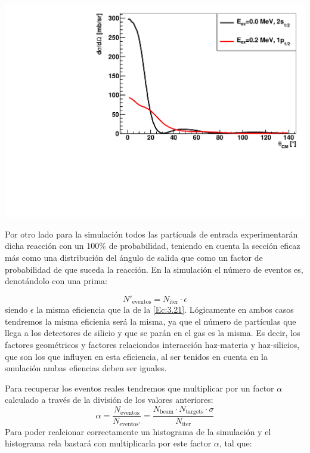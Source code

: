 \begin{center}
	\includegraphics[width=0.7\linewidth]{Imagenes/Seccion_Eficaz.pdf}
	\label{Fig:04-seccion_eficaz}
\end{center}

Por otro lado para la simulación todos las partícuals de entrada experimentarán dicha reacción con un 100\% de probabilidad, teniendo en cuenta la sección eficaz más como una distribución del ángulo de salida que como un factor de probabilidad de  que suceda la reacción. En la simulación el número de eventos es, denotándolo con una prima:

\begin{equation}
	N'_{\text{eventos}} = N_{\text{iter}} \cdot \epsilon
\end{equation}
siendo $\epsilon$ la misma eficiencia que la de la \cref{Ec:3.21}. Lógicamente en ambos casos tendremos la misma eficienia será la misma, ya que el número de partículas que llega a los detectores de silicio y que se parán en el gas es la misma. Es decir, los factores geométricos y factores relaciondos interacción haz-materia y haz-silicios, que son los que influyen en esta eficiencia, al ser tenidos en cuenta en la smulación ambas efiencias deben ser iguales.

Para recuperar los eventos reales tendremos que multiplicar por un factor $\alpha$ calculado a través de la división de los valores anteriores: 
\begin{equation}
	\alpha=\frac{N_{\text{eventos}}}{N_ {\text{eventos}'}} = \frac{N_{\text{beam}} \cdot N_{\text{targets}} \cdot \sigma}{N_{\text{iter}}}
\end{equation}
Para poder realcionar correctamente un histograma de la simulación y el histograma rela bastará con multiplicarla por este factor $\alpha$, tal que:

